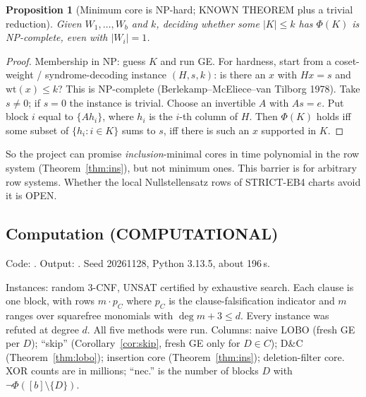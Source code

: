 \documentclass[11pt]{article}
\newtheorem{proposition}[theorem]{Proposition}
\theoremstyle{definition}
\begin{document}
\begin{proposition}[Minimum core is NP-hard; KNOWN THEOREM plus a trivial reduction]\label{prop:np}
Given $W_1,\dots,W_b$ and $k$, deciding whether some $|K|\le k$ has $\Phi(K)$ is NP-complete, even with $|W_i|=1$.
\end{proposition}
\begin{proof}
Membership in NP: guess $K$ and run GE. For hardness, start from a coset-weight / syndrome-decoding instance $(H,s,k)$: is there an $x$ with $Hx=s$ and $\mathrm{wt}(x)\le k$? This is NP-complete (Berlekamp--McEliece--van Tilborg 1978). Take $s\neq0$; if $s=0$ the instance is trivial. Choose an invertible $A$ with $As=e$. Put block $i$ equal to $\{Ah_i\}$, where $h_i$ is the $i$-th column of $H$. Then $\Phi(K)$ holds iff some subset of $\{h_i:i\in K\}$ sums to $s$, iff there is such an $x$ supported in $K$.
\end{proof}
\noindent So the project can promise \emph{inclusion}-minimal cores in time polynomial in the row system (Theorem~\ref{thm:ins}), but not minimum ones. This barrier is for arbitrary row systems. Whether the local Nullstellensatz rows of STRICT-EB4 charts avoid it is OPEN.

\subsection{Computation (COMPUTATIONAL)}\label{sec:comp}
Code: . Output: . Seed 20261128, Python 3.13.5, about 196\,s.

Instances: random 3-CNF, UNSAT certified by exhaustive search. Each clause is one block, with rows $m\cdot p_C$ where $p_C$ is the clause-falsification indicator and $m$ ranges over squarefree monomials with $\deg m+3\le d$. Every instance was refuted at degree $d$. All five methods were run. Columns: naive LOBO (fresh GE per $D$); ``skip'' (Corollary~\ref{cor:skip}, fresh GE only for $D\in C$); D\&C (Theorem~\ref{thm:lobo}); insertion core (Theorem~\ref{thm:ins}); deletion-filter core. XOR counts are in millions; ``nec.'' is the number of blocks $D$ with $\neg\Phi([b]\setminus\{D\})$.
\end{document}
